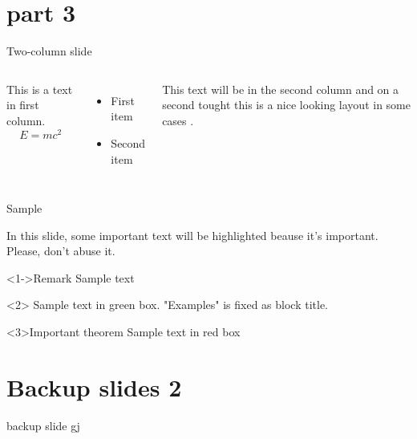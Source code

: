 \documentclass[11pt,aspectratio=1610]{beamer}	%
\begin{document}
\section{part 3}

\begin{frame}{Two-column slide}{}
	\begin{columns}[t]
		This is a text in first column.
		$$E=mc^2$$
		\begin{itemize}
		\item First item
		\item Second item
		\end{itemize}
		
		This text will be in the second column
		and on a second tought this is a nice looking
		layout in some cases \citep{Venzmer2018}.
	\end{columns}
\end{frame}

\begin{frame}[t]{Sample}{}
	
	In this slide, some important text will be
	\alert<2->{highlighted} beause it's important.
	Please, don't abuse it.
	
	\begin{block}<1->{Remark}
	Sample text
	\end{block}
	
	\begin{examples}
	Sample text in green box. "Examples" is fixed as block title.
	\end{examples}
	
	\begin{alertblock}{Important theorem}
	Sample text in red box
	\end{alertblock}
	
\end{frame}

\section{Backup slides 2}

\begin{frame}{backup slide}{}
	gj
\end{frame}

%
\end{document}
